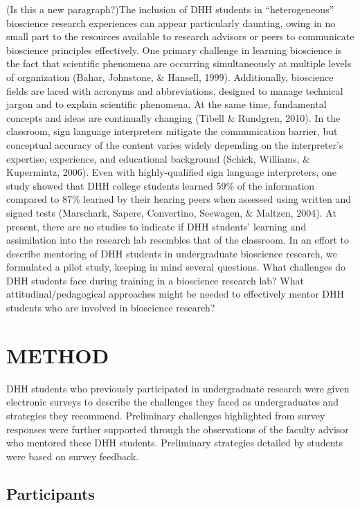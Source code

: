 \documentclass[11.5pt]{sig-alternate} %
\begin{document}
\begin{large}
(Is this a new paragraph?)The inclusion of DHH students in “heterogeneous” bioscience research experiences can appear particularly daunting, owing in no small part to the resources available to research advisors or peers to communicate bioscience principles effectively. One primary challenge in learning bioscience is the fact that scientific phenomena are occurring simultaneously at multiple levels of organization (Bahar, Johnstone, \& Hansell, 1999). Additionally, bioscience fields are laced with acronyms and abbreviations, designed to manage technical jargon and to explain scientific phenomena. At the same time, fundamental concepts and ideas are continually changing (Tibell \& Rundgren, 2010). In the classroom, sign language interpreters mitigate the communication barrier, but conceptual accuracy of the content varies widely depending on the interpreter’s expertise, experience, and educational background (Schick, Williams, \& Kupermintz, 2006). Even with highly-qualified sign language interpreters, one study showed that DHH college students learned 59\% of the information compared to 87\% learned by their hearing peers when assessed using written and signed tests (Marschark, Sapere, Convertino, Seewagen, \& Maltzen, 2004). At present, there are no studies to indicate if DHH students’ learning and assimilation into the research lab resembles that of the classroom. In an effort to describe mentoring of DHH students in undergraduate bioscience research, we formulated a pilot study, keeping in mind several questions. What challenges do DHH students face during training in a bioscience research lab? What attitudinal/pedagogical approaches might be needed to effectively mentor DHH students who are involved in bioscience research?

\section*{METHOD}

DHH students who previously participated in undergraduate research were given electronic surveys to describe the challenges they faced as undergraduates and strategies they recommend. Preliminary challenges highlighted from survey responses were further supported through the observations of the faculty advisor who mentored these DHH students. Preliminary strategies detailed by students were based on survey feedback.  

\subsection*{Participants}


\end{large}
\end{document}

